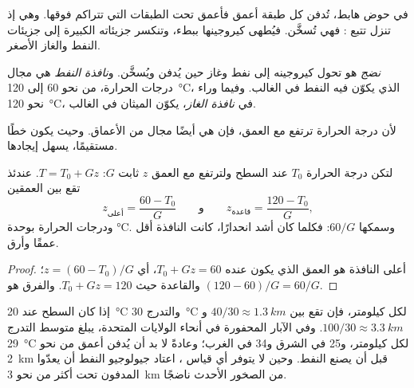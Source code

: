 في حوض هابط، تُدفن كل طبقة أعمق فأعمق تحت الطبقات
التي تتراكم فوقها. وهي إذ تنزل تتبع : فهي
تُسخَّن. فيُطهى كيروجينها ببطء، وتنكسر جزيئاته الكبيرة إلى
جزيئات النفط والغاز الأصغر.

\begin{definition}\label{def:g11:fossil-fuel-geology:oil-window}
\emph{نضج}  هو
تحول كيروجينه إلى نفط وغاز حين يُدفن ويُسخَّن.
و\emph{نافذة النفط} هي مجال درجات الحرارة، من
نحو 60 إلى \qty{120}{\degreeCelsius}، الذي يكوّن فيه  النفط في الغالب.
وفيما وراء نحو \qty{120}{\degreeCelsius}، في \emph{نافذة
الغاز}، يكوّن الميثان في الغالب.
\end{definition}

لأن درجة الحرارة ترتفع مع العمق، فإن  هي أيضًا مجال من
الأعماق. وحيث يكون  خطًا مستقيمًا، يسهل إيجادها.

\begin{proposition}\label{prop:g11:fossil-fuel-geology:window-depth}
لتكن درجة الحرارة $T_0$ عند السطح ولترتفع مع العمق $z$  ثابت $G$: $T = T_0 + G z$. عندئذ تقع 
بين العمقين
\[
  z_{\text{أعلى}} = \frac{60 - T_0}{G}
  \qquad\text{و}\qquad
  z_{\text{قاعدة}} = \frac{120 - T_0}{G},
\]
ودرجات الحرارة بوحدة \unit{\degreeCelsius}. وسمكها $60/G$: فكلما
كان  أشد انحدارًا، كانت النافذة أقل عمقًا وأرق.
\end{proposition}

\begin{proof}
أعلى النافذة هو العمق الذي يكون عنده $T_0 + G z = 60$، أي
$z = (60 - T_0)/G$؛ والقاعدة حيث $T_0 + G z = 120$. والفرق هو
$(120 - 60)/G = 60/G$.
\end{proof}

إذا كان السطح عند \qty{20}{\degreeCelsius} والتدرج
\qty{30}{\degreeCelsius} لكل كيلومتر، فإن  تقع بين
$40/30 \approx \qty{1.3}{km}$ و$100/30 \approx \qty{3.3}{km}$. وفي الآبار
المحفورة في أنحاء الولايات المتحدة، يبلغ متوسط التدرج
\qty{29}{\degreeCelsius} لكل كيلومتر، و\num{25} في الشرق و\num{34}
في الغرب؛ وعادةً لا بد أن يُدفن  أعمق من نحو
\qty{2}{km} قبل أن يصنع النفط. وحين لا يتوفر أي قياس ،
اعتاد جيولوجيو النفط أن يعدّوا  المدفون تحت أكثر
من نحو \qty{3}{km} من الصخور الأحدث ناضجًا.

